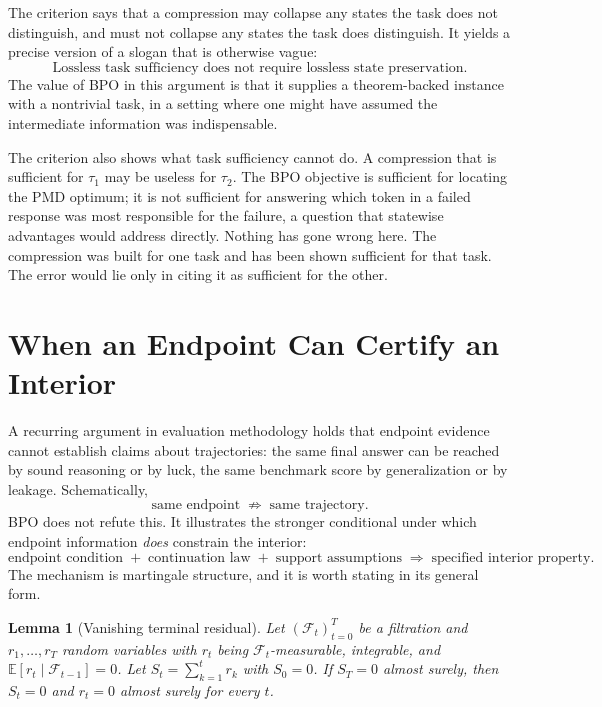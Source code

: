 \documentclass[11pt]{article}
\newtheorem{lemma}{Lemma}
\theoremstyle{remark}
\begin{document}
The criterion says that a compression may collapse any states the task does not distinguish, and must not collapse any states the task does distinguish. It yields a precise version of a slogan that is otherwise vague:
\[
\boxed{\text{Lossless task sufficiency does not require lossless state preservation.}}
\]
The value of BPO in this argument is that it supplies a theorem-backed instance with a nontrivial task, in a setting where one might have assumed the intermediate information was indispensable.

The criterion also shows what task sufficiency cannot do. A compression that is sufficient for $\tau_1$ may be useless for $\tau_2$. The BPO objective is sufficient for locating the PMD optimum; it is not sufficient for answering which token in a failed response was most responsible for the failure, a question that statewise advantages would address directly. Nothing has gone wrong here. The compression was built for one task and has been shown sufficient for that task. The error would lie only in citing it as sufficient for the other.

\section{When an Endpoint Can Certify an Interior}\label{sec:endpoint}

A recurring argument in evaluation methodology holds that endpoint evidence cannot establish claims about trajectories: the same final answer can be reached by sound reasoning or by luck, the same benchmark score by generalization or by leakage. Schematically,
\[
\text{same endpoint}\;\not\Rightarrow\;\text{same trajectory}.
\]
BPO does not refute this. It illustrates the stronger conditional under which endpoint information \emph{does} constrain the interior:
\[
\text{endpoint condition} \;+\; \text{continuation law} \;+\; \text{support assumptions}
\;\Rightarrow\; \text{specified interior property}.
\]
The mechanism is martingale structure, and it is worth stating in its general form.

\begin{lemma}[Vanishing terminal residual]\label{lem:mart}
Let $(\mathcal F_t)_{t=0}^{T}$ be a filtration and $r_1,\dots,r_T$ random variables with $r_t$ being $\mathcal F_t$-measurable, integrable, and $\mathbb E[r_t\mid\mathcal F_{t-1}]=0$. Let $S_t=\sum_{k=1}^{t}r_k$ with $S_0=0$. If $S_T=0$ almost surely, then $S_t=0$ and $r_t=0$ almost surely for every $t$.
\end{lemma}
\end{document}
